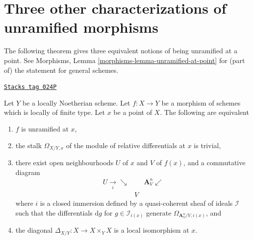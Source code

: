 \section{Three other characterizations of unramified morphisms}
\label{etale-section-three-other}
The following theorem gives three equivalent notions of being
unramified at a point. See
Morphisms, Lemma \ref{morphisms-lemma-unramified-at-point}
for (part of) the statement for general schemes.

\begin{theorem}
\label{etale-theorem-unramified-equivalence}
\href{https://stacks.math.columbia.edu/tag/024P}{\texttt{Stacks tag 024P}}

Let $Y$ be a locally Noetherian scheme.
Let $f : X \to Y$ be a morphism of schemes which is locally of finite type.
Let $x$ be a point of $X$. The following are equivalent
\begin{enumerate}
\item $f$ is unramified at $x$,
\item the stalk $\Omega_{X/Y, x}$ of the module of relative differentials
at $x$ is trivial,
\item there exist open neighbourhoods $U$ of $x$ and $V$ of $f(x)$, and a
commutative diagram
$$
\begin{array}{ccc}U \underset{i}{\longrightarrow}\searrow &  & \mathbf{A}^n_V \swarrow \\  & V & \end{array}
$$
where $i$ is a closed immersion defined by a
quasi-coherent sheaf of ideals $\mathcal{I}$ such that the differentials
$\text{d}g$ for $g \in \mathcal{I}_{i(x)}$ generate
$\Omega_{\mathbf{A}^n_V/V, i(x)}$, and
\item the diagonal $\Delta_{X/Y} : X \to X \times_Y X$
is a local isomorphism at $x$.
\end{enumerate}
\end{theorem}

